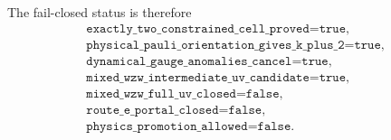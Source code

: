 \documentclass[11pt]{article}
\theoremstyle{definition}
\theoremstyle{remark}
\begin{document}
The fail-closed status is therefore
\begin{equation}
 \boxed{\begin{gathered}
 \texttt{exactly\_two\_constrained\_cell\_proved=true},\\
 \texttt{physical\_pauli\_orientation\_gives\_k\_plus\_2=true},\\
 \texttt{dynamical\_gauge\_anomalies\_cancel=true},\\
 \texttt{mixed\_wzw\_intermediate\_uv\_candidate=true},\\
 \texttt{mixed\_wzw\_full\_uv\_closed=false},\\
 \texttt{route\_e\_portal\_closed=false},\\
 \texttt{physics\_promotion\_allowed=false}.
 \end{gathered}}
 \label{eq:final-status}
\end{equation}



\end{document}
